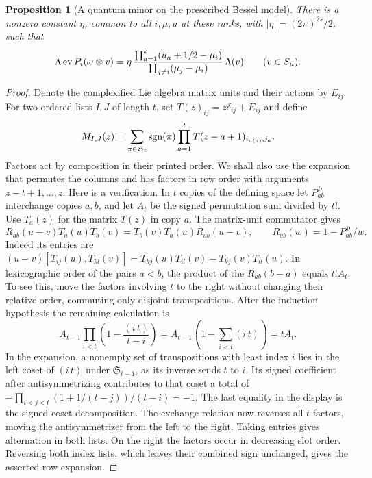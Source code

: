 \documentclass[a4paper,11pt]{article}
\newtheorem{proposition}{Proposition}[section]
\theoremstyle{definition}
\theoremstyle{remark}
\numberwithin{equation}{section}
\begin{document}
\begin{proposition}[A quantum minor on the prescribed Bessel model]\leavevmode
\label{prop:cofactor286}
There is a nonzero constant \(\eta\), common to all \(i,\mu,u\)
at these ranks, with \(|\eta|=(2\pi)^{2s}/2\), such that
\[
 \Lambda\,{\rm ev}\,P_i(\omega\otimes v)
  = \eta\,
   \frac{\prod_{a=1}^k(u_a+1/2-\mu_i)}
        {\prod_{j\ne i}(\mu_j-\mu_i)}\,\Lambda(v)
 \qquad (v\in S_\mu).
\]
\end{proposition}
\begin{proof}
Denote the complexified Lie algebra matrix units and their
actions by \(E_{ij}\). For two ordered lists \(I,J\) of length
\(t\), set \(T(z)_{ij}=z\delta_{ij}+E_{ij}\) and define
\[
 M_{I,J}(z)=\sum_{\pi\in\mathfrak S_t}{\rm sgn}(\pi)
           \prod_{a=1}^{t}T(z-a+1)_{i_{\pi(a)},j_a}.
\]
Factors act by composition in their printed order. We shall
also use the expansion that permutes the columns and has
factors in row order with arguments \(z-t+1,\ldots,z\).
Here is a verification. In \(t\) copies of the defining
space let \(P_{ab}^{\,0}\) interchange copies \(a,b\), and
let \(A_t\) be the signed permutation sum divided by \(t!\).
Use \(T_a(z)\) for the matrix \(T(z)\) in copy \(a\).
The matrix-unit commutator gives
\[
 R_{ab}(u-v)T_a(u)T_b(v)=T_b(v)T_a(u)R_{ab}(u-v),
 \qquad R_{ab}(w)=1-P_{ab}^{\,0}/w .
\]
Indeed its entries are
\((u-v)[T_{ij}(u),T_{kl}(v)]
=T_{kj}(u)T_{il}(v)-T_{kj}(v)T_{il}(u)\).
In lexicographic order of the pairs \(a<b\), the product of
the \(R_{ab}(b-a)\) equals \(t!A_t\). To see this, move the
factors involving \(t\) to the right without changing their
relative order, commuting only disjoint transpositions.
After the induction hypothesis the remaining calculation is
\[
 A_{t-1}\prod_{i<t}\left(1-\frac{(i\,t)}{t-i}\right)
             =A_{t-1}\left(1-\sum_{i<t}(i\,t)\right)=t A_t .
\]
In the expansion, a nonempty set of transpositions with least
index \(i\) lies in the left coset of \((i\,t)\) under
\(\mathfrak S_{t-1}\), as its inverse sends \(t\) to \(i\).
Its signed coefficient after antisymmetrizing contributes
to that coset a total of
\(-\prod_{i<j<t}(1+1/(t-j))/(t-i)=-1\).
The last equality in the display is the signed coset decomposition.
The exchange relation now reverses all \(t\) factors, moving
the antisymmetrizer from the left to the right. Taking entries
gives alternation in both lists. On the right the factors
occur in decreasing slot order. Reversing both index lists,
which leaves their combined sign unchanged, gives the asserted
row expansion.


\end{proof}
\end{document}
